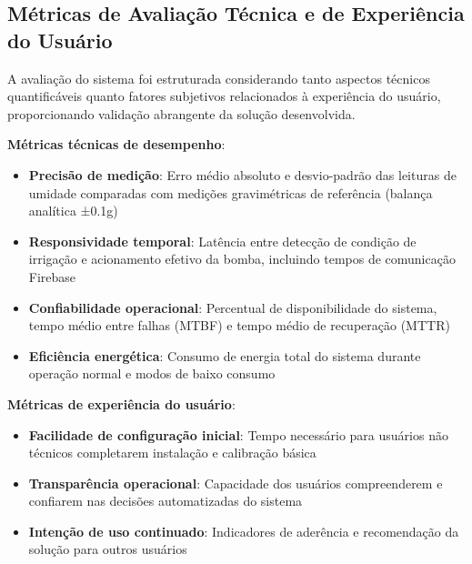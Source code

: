 \documentclass[twoside,english,brazilian]{UNISINOSmonografia}
\begin{document}

\subsection{Métricas de Avaliação Técnica e de Experiência do Usuário}

A avaliação do sistema foi estruturada considerando tanto aspectos técnicos quantificáveis quanto fatores subjetivos relacionados à experiência do usuário, proporcionando validação abrangente da solução desenvolvida.

\textbf{Métricas técnicas de desempenho}:
\begin{itemize}
\item \textbf{Precisão de medição}: Erro médio absoluto e desvio-padrão das leituras de umidade comparadas com medições gravimétricas de referência (balança analítica ±0.1g)
\item \textbf{Responsividade temporal}: Latência entre detecção de condição de irrigação e acionamento efetivo da bomba, incluindo tempos de comunicação Firebase
\item \textbf{Confiabilidade operacional}: Percentual de disponibilidade do sistema, tempo médio entre falhas (MTBF) e tempo médio de recuperação (MTTR)
\item \textbf{Eficiência energética}: Consumo de energia total do sistema durante operação normal e modos de baixo consumo
\end{itemize}

\textbf{Métricas de experiência do usuário}:
\begin{itemize}
\item \textbf{Facilidade de configuração inicial}: Tempo necessário para usuários não técnicos completarem instalação e calibração básica
\item \textbf{Transparência operacional}: Capacidade dos usuários compreenderem e confiarem nas decisões automatizadas do sistema
\item \textbf{Intenção de uso continuado}: Indicadores de aderência e recomendação da solução para outros usuários
\end{itemize}


\end{document}
